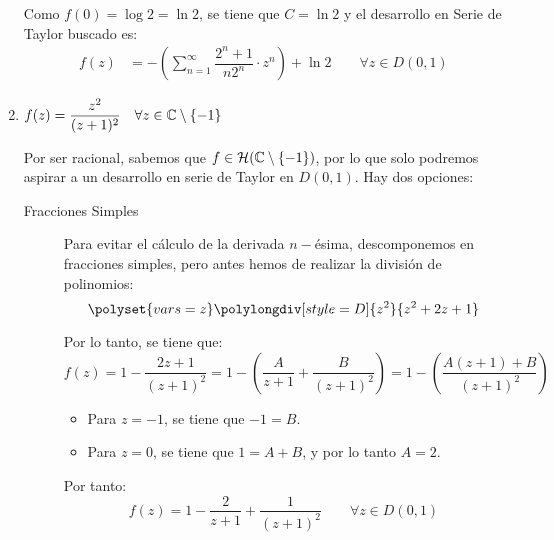 \begin{ejercicio}
\begin{enumerate}
        Como $f(0)=\log 2 = \ln 2$, se tiene que $C=\ln 2$ y el desarrollo en Serie de Taylor buscado es:
        \begin{align*}
            f(z) &= -\left(\sum_{n=1}^{\infty}\dfrac{2^{n}+1}{n2^n}\cdot z^{n}\right)+\ln 2 \qquad \forall z \in D(0,1)
        \end{align*} 
        \item $f(z) = \dfrac{z^2}{(z+1)^2} \quad \forall z \in \mathbb{C}\setminus\{-1\}$
        
        Por ser racional, sabemos que $f\in \mathcal{H}(\mathbb{C}\setminus\{-1\})$, por lo que solo podremos aspirar a un desarrollo en serie de Taylor en $D(0,1)$. Hay dos opciones:
        \begin{description}
            \item[Fracciones Simples] 
            
            Para evitar el cálculo de la derivada $n-$ésima, descomponemos en fracciones simples, pero antes hemos de realizar la división de polinomios:
            \begin{equation*}
                \polyset{vars=z}
                \polylongdiv[style=D]{z^2}{z^2+2z+1}
            \end{equation*}

            Por lo tanto, se tiene que:
            \begin{equation*}
                f(z) = 1 - \frac{2z+1}{(z+1)^2} = 1-\left(\dfrac{A}{z+1}+\dfrac{B}{(z+1)^2}\right)
                = 1-\left(\dfrac{A(z+1)+B}{(z+1)^2}\right)
            \end{equation*}
            \begin{itemize}
                \item Para $z=-1$, se tiene que $-1=B$.
                \item Para $z=0$, se tiene que $1=A+B$, y por lo tanto $A=2$.
            \end{itemize}

            Por tanto:
            \begin{equation*}
                f(z) = 1 - \frac{2}{z+1} + \frac{1}{(z+1)^2} \qquad \forall z \in D(0,1)
            \end{equation*}


\end{description}
\end{enumerate}
\end{ejercicio}
